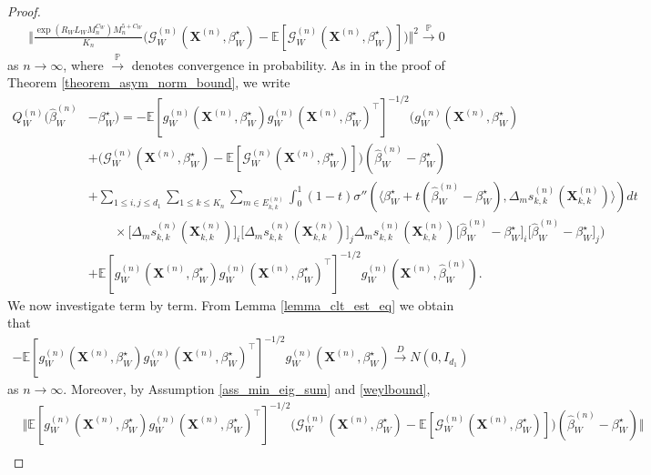 \documentclass{article}
\begin{document}
\begin{proof}
\begin{align} \label{conv_prob_proof_asymp_norm_conv}
    \bigg\Vert \frac{\exp(R_WL_WM_n^{C_W}) M_n^{5+C_W}}{K_n} \big( \mathcal{G}_W^{(n)}(\mathbf{X}^{(n)},\beta_W^{\star}) - \mathbb{E}[\mathcal{G}_W^{(n)}(\mathbf{X}^{(n)},\beta_W^{\star})] \big) \bigg\Vert^2 \xrightarrow{\mathbb{P}} 0
\end{align}
as $n \rightarrow \infty$, where $\xrightarrow{\mathbb{P}}$ denotes convergence in probability. As in in the proof of Theorem \ref{theorem_asym_norm_bound}, we write 
\begin{align*}
     Q_W^{(n)} \big( \hat{\beta}_W^{(n)}&-\beta_W^{\star}\big) = -\mathbb{E}[g_W^{(n)}(\mathbf{X}^{(n)},\beta_W^{\star})g_W^{(n)}(\mathbf{X}^{(n)},\beta_W^{\star})^{\top}]^{-1/2} \bigg( g_W^{(n)}(\mathbf{X}^{(n)},\beta_W^{\star}) \\
    &+ \big(\mathcal{G}_W^{(n)}(\mathbf{X}^{(n)},\beta_W^{\star}) - \mathbb{E}[\mathcal{G}_W^{(n)}(\mathbf{X}^{(n)},\beta_W^{\star})]  \big)(\hat{\beta}_W^{(n)} - \beta_W^{\star}) \\
    & +\sum_{1 \leq i,j \leq d_1} \sum_{1\leq k \leq K_n} \sum_{m \in E_{k,k}^{(n)}} \int_0^1 (1-t) \sigma'' ( \langle \beta_W^{\star} + t(\hat{\beta}_W^{(n)} - \beta_W^{\star}) , \Delta_m s_{k,k}^{(n)}(\mathbf{X}_{k,k}^{(n)}) \rangle )dt  \\
    & \qquad \times \big[\Delta_m s_{k,k}^{(n)}(\mathbf{X}_{k,k}^{(n)}) \big]_i \big[\Delta_m s_{k,k}^{(n)}(\mathbf{X}_{k,k}^{(n)}) \big]_j \Delta_m s_{k,k}^{(n)}(\mathbf{X}_{k,k}^{(n)})  \big[ \hat{\beta}_W^{(n)}-\beta_W^{\star}\big]_i \big[ \hat{\beta}_W^{(n)}-\beta_W^{\star}\big]_j \bigg) \\
     & +\mathbb{E}[g_W^{(n)}(\mathbf{X}^{(n)},\beta_W^{\star})g_W^{(n)}(\mathbf{X}^{(n)},\beta_W^{\star})^{\top}]^{-1/2} g_W^{(n)}(\mathbf{X}^{(n)},\hat{\beta}_W^{(n)}).
\end{align*}
We now investigate term by term. From Lemma \ref{lemma_clt_est_eq} we obtain that
\begin{align*}
    -\mathbb{E}[g_W^{(n)}(\mathbf{X}^{(n)},\beta_W^{\star})g_W^{(n)}(\mathbf{X}^{(n)},\beta_W^{\star})^{\top}]^{-1/2}  g_W^{(n)}(\mathbf{X}^{(n)},\beta_W^{\star})  \xrightarrow{D} N(0,I_{d_1})
\end{align*}
as $n \rightarrow \infty$. Moreover, by Assumption \ref{ass_min_eig_sum} and \eqref{weylbound},
\begin{align*}
    & \big \Vert \mathbb{E}[g_W^{(n)}(\mathbf{X}^{(n)},\beta_W^{\star})g_W^{(n)}(\mathbf{X}^{(n)},\beta_W^{\star})^{\top}]^{-1/2} \big(\mathcal{G}_W^{(n)}(\mathbf{X}^{(n)},\beta_W^{\star}) - \mathbb{E}[\mathcal{G}_W^{(n)}(\mathbf{X}^{(n)},\beta_W^{\star})]  \big)(\hat{\beta}_W^{(n)} - \beta_W^{\star}) \big\Vert \\

\end{align*}
\end{proof}
\end{document}
